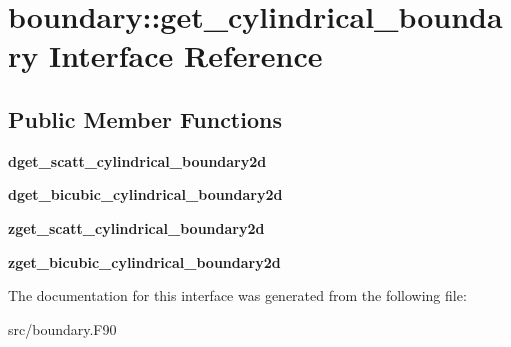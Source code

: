 \hypertarget{interfaceboundary_1_1get__cylindrical__boundary}{}\section{boundary\+:\+:get\+\_\+cylindrical\+\_\+boundary Interface Reference}
\label{interfaceboundary_1_1get__cylindrical__boundary}
\subsection*{Public Member Functions}
\begin{DoxyCompactItemize}
\item 
\mbox{\label{interfaceboundary_1_1get__cylindrical__boundary_ab895fb6137dc4d5e949d5d8c0d1d278c}} 
{\bfseries dget\+\_\+scatt\+\_\+cylindrical\+\_\+boundary2d}
\item 
\mbox{\label{interfaceboundary_1_1get__cylindrical__boundary_a8239d0a5abc6dff629805e4596eaf67d}} 
{\bfseries dget\+\_\+bicubic\+\_\+cylindrical\+\_\+boundary2d}
\item 
\mbox{\label{interfaceboundary_1_1get__cylindrical__boundary_a068e397dfd8b243c7cb96a1df90cf47b}} 
{\bfseries zget\+\_\+scatt\+\_\+cylindrical\+\_\+boundary2d}
\item 
\mbox{\label{interfaceboundary_1_1get__cylindrical__boundary_a5232ceaa3fd01a6677ba85f4e4d3dcd5}} 
{\bfseries zget\+\_\+bicubic\+\_\+cylindrical\+\_\+boundary2d}
\end{DoxyCompactItemize}


The documentation for this interface was generated from the following file\+:\begin{DoxyCompactItemize}
\item 
src/boundary.\+F90\end{DoxyCompactItemize}
